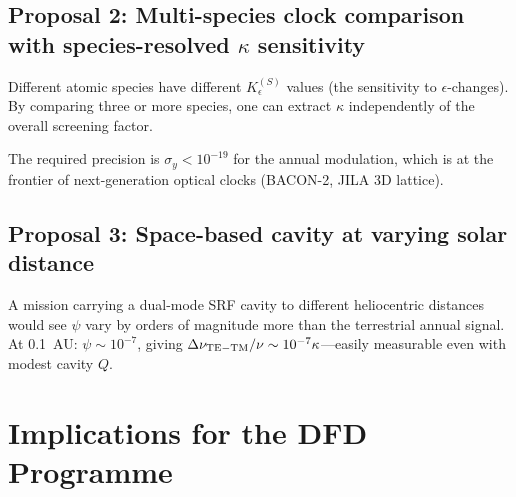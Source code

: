 \documentclass[11pt,a4paper]{article}
\theoremstyle{definition}
\begin{document}
\subsection{Proposal 2: Multi-species clock comparison with
  species-resolved $\kappa$ sensitivity}

Different atomic species have different $K_\epsilon^{(S)}$ values
(the sensitivity to $\epsilon$-changes).  By comparing three or
more species, one can extract $\kappa$ independently of the
overall screening factor.

The required precision is $\sigma_y < 10^{-19}$ for the
annual modulation, which is at the frontier of next-generation
optical clocks (BACON-2, JILA 3D lattice).

\subsection{Proposal 3: Space-based cavity at varying
  solar distance}

A mission carrying a dual-mode SRF cavity to different
heliocentric distances would see $\psi$ vary by orders of
magnitude more than the terrestrial annual signal.
At 0.1~AU: $\psi \sim 10^{-7}$, giving
$\Delta\nu_{\rm TE-TM}/\nu \sim 10^{-7}\kappa$---easily
measurable even with modest cavity $Q$.


\section{Implications for the DFD Programme}
\label{sec:implications}
\end{document}
